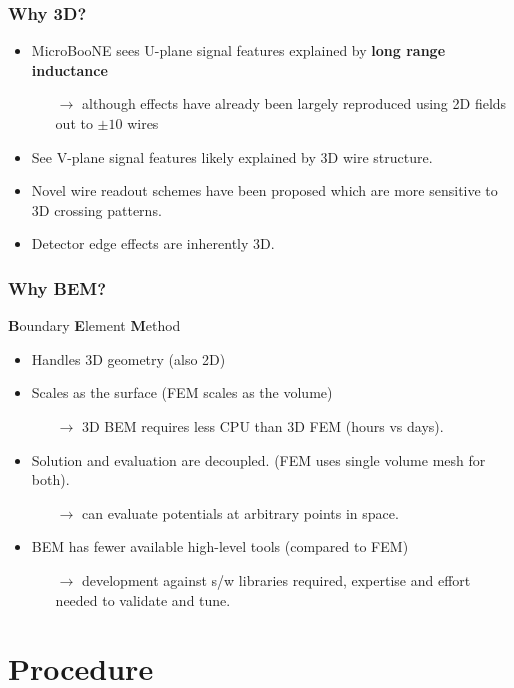 \documentclass[xcolor=dvipsnames]{beamer}
\begin{document}
\begin{frame}
  \frametitle{Why 3D?}
  \begin{itemize}
  \item MicroBooNE sees U-plane signal features explained by
    \textbf{long range inductance}
    \begin{itemize}\footnotesize
    \item[$\rightarrow$] although effects have already been largely
      reproduced using 2D fields out to $\pm10$ wires
    \end{itemize}
  \item See V-plane signal features likely explained by 3D wire
    structure.
  \item Novel wire readout schemes have been proposed which are more
    sensitive to 3D crossing patterns.
  \item Detector edge effects are inherently 3D.
  \end{itemize}
\end{frame}

\begin{frame}
  \frametitle{Why BEM?}
  \textbf{B}oundary \textbf{E}lement \textbf{M}ethod
  \begin{itemize}
  \item Handles 3D geometry (also 2D)
  \item Scales as the surface (FEM scales as the volume)
    \begin{itemize}
    \item[$\rightarrow$] 3D BEM requires less CPU than 3D FEM (hours vs days).
    \end{itemize}
  \item Solution and evaluation are decoupled. (FEM uses single volume mesh for both).
    \begin{itemize}
    \item[$\rightarrow$] can evaluate potentials at arbitrary points in space.
    \end{itemize}
  \item BEM has fewer available high-level tools (compared to FEM)
    \begin{itemize}
    \item[$\rightarrow$] development against s/w libraries required,
      expertise and effort needed to validate and tune.
    \end{itemize}
  \end{itemize}
\end{frame}

\section{Procedure}
\end{document}
